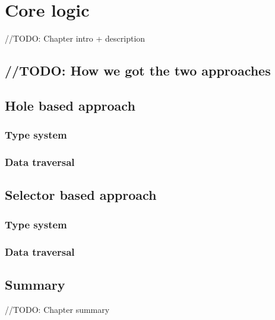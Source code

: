 \chapter{Core logic}
\label{chap:core-logic}

//TODO: Chapter intro + description

\section{//TODO: How we got the two approaches}

\section{Hole based approach}
\subsection{Type system}
\subsection{Data traversal}
\subsection{}
\section{Selector based approach}
\subsection{Type system}
\subsection{Data traversal}
\subsection{}

\section{Summary}
//TODO: Chapter summary
